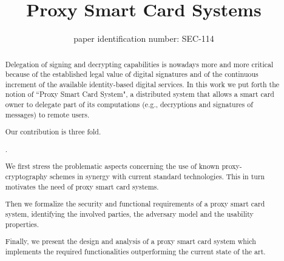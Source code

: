 \documentclass{sig-alternate}
\newcounter{itemcount}
\newenvironment{myenumerate}
{\setcounter{itemcount}{0}\begin{list}
{\arabic{itemcount}.}{\usecounter{itemcount} \itemindent=0.0cm
\itemsep=0.0in
\parsep=0.0in
\topsep=0.0in
\partopsep=0.0in}}{\end{list}}
\begin{document}
\title{Proxy Smart Card Systems}
\subtitle{paper identification number: SEC-114}
%

\maketitle
\begin{abstract}
Delegation of signing and decrypting capabilities
is nowadays more and more
critical because of the established legal value of digital signatures
and of the continuous increment of the available identity-based digital
services.
In this work we put forth the notion of ``Proxy Smart Card System", a
distributed system that allows a smart card owner to delegate part of
its computations (e.g., decryptions and signatures of messages) to
remote users. 

Our contribution is three fold. 
\begin{myenumerate}
\item We first stress the problematic aspects concerning 
the use of known proxy-cryptography schemes in synergy with current standard technologies. 
This in turn motivates the need of proxy smart card systems.
\item Then we formalize the security and functional requirements of a proxy
smart card system, identifying the involved parties, the adversary model
and the usability properties.
\item Finally, we present the design and analysis of a proxy smart card
system which implements the required functionalities outperforming
the current state of the art.
\end{myenumerate}
\end{abstract}

\end{document}

